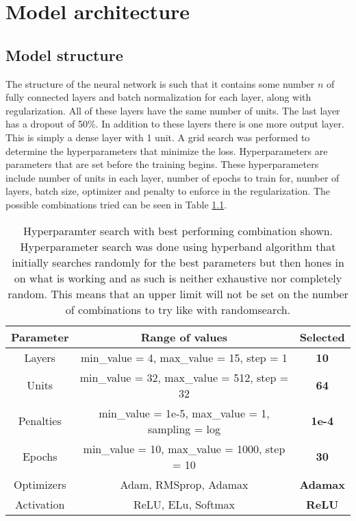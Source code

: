 
\chapter{Model architecture} %

\label{Chapter4} %


\section{Model structure}
The structure of the neural network is such that it contains some number $n$ of fully connected layers and batch normalization for each layer, along with regularization. All of these layers have the same number of units. The last layer has a dropout of 50\%. In addition to these layers there is one more output layer. This is simply a dense layer with 1 unit. A grid search was performed to determine the hyperparameters that minimize the loss. Hyperparameters are parameters that are set before the training begins\cite{hyperparameters_definition}. These hyperparameters include number of units in each layer, number of epochs to train for, number of layers, batch size, optimizer and penalty to enforce in the regularization. The possible combinations tried can be seen in Table \ref{table:gridSearchHyperparamters}.

\begin{table}[h]
    \centering
    \caption[Hyperparamter search with best performing combination.]{Hyperparamter search with best performing combination shown. Hyperparameter search was done using hyperband algorithm that initially searches randomly for the best parameters but then hones in on what is working and as such is neither exhaustive nor completely random. This means that an upper limit will not be set on the number of combinations to try like with randomsearch.}
    \label{table:gridSearchHyperparamters}
    \begin{tabular}{c|c|c}
        Parameter & Range of values & Selected\\\hline
        Layers &  min\_value = 4, max\_value = 15, step = 1 & \textbf{10}\\\hline
        Units &  min\_value = 32, max\_value = 512, step = 32 & \textbf{64}\\\hline
        Penalties & min\_value = 1e-5, max\_value = 1, sampling = log & \textbf{1e-4}\\\hline
        Epochs & min\_value = 10, max\_value = 1000, step = 10 & \textbf{30}\\\hline
        Optimizers & Adam, RMSprop, Adamax & \textbf{Adamax}\\\hline
        Activation & ReLU, ELu, Softmax & \textbf{ReLU}\\\hline
    \end{tabular}
\end{table}